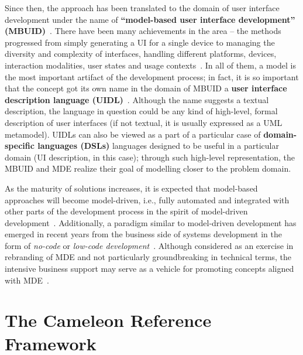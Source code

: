 Since then, the approach has been translated to the domain of user interface development under the name of \textbf{\enquote{model-based user interface development} (MBUID)}~\cite{Puerta1994}.
There have been many achievements in the area – the methods progressed from simply generating a UI for a single device to managing the diversity and complexity of interfaces, handling different platforms, devices, interaction modalities, user states and usage contexts~\cite{Meixner2011}.
In all of them, a model is the most important artifact of the development process;
in fact, it is so important that the concept got its own name in the domain of MBUID\,\textendash\,a \textbf{user interface description language (UIDL)}~\cite{guerrero_garcia_theoretical_2009}.
Although the name suggests a textual description, the language in question could be any kind of high-level, formal description of user interfaces (if not textual, it is usually expressed as a UML metamodel).
UIDLs can also be viewed as a part of a particular case of \textbf{domain-specific languages (DSLs)}\,\textendash\,languages designed to be useful in a particular domain (UI description, in this case);
through such high-level representation, the MBUID and MDE realize their goal of modelling closer to the problem domain.

As the maturity of solutions increases, it is expected that model-based approaches will become model-driven, i.e., fully automated and integrated with other parts of the development process in the spirit of model-driven development~\cite{Ruiz2018}.
Additionally, a paradigm similar to model-driven development has emerged in recent years from the business side of systems development in the form of \emph{no-code} or \emph{low-code development}~\cite{Rymer2019}.
Although considered as an exercise in rebranding of MDE and not particularly groundbreaking in technical terms, the intensive business support may serve as a vehicle for promoting concepts aligned with MDE~\cite{Bock2021}.

\section{The Cameleon Reference Framework}\label{sec:the-cameleon-reference-framework}

